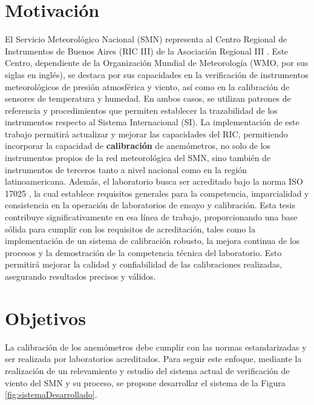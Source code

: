 \section{Motivación}\label{sec:motivacion}

El Servicio Meteorológico Nacional (SMN) representa al Centro Regional de Instrumentos de Buenos Aires (RIC III) de la Asociación Regional III \cite{RIC_Argentina}. Este Centro, dependiente de la Organización Mundial de Meteorología (WMO, por sus siglas en inglés), se destaca por sus capacidades en la verificación de instrumentos meteorológicos de presión atmosférica y viento, así como en la calibración de sensores de temperatura y humedad. En ambos casos, se utilizan patrones de referencia y procedimientos que permiten establecer la trazabilidad de los instrumentos respecto al Sistema Internacional (SI). La implementación de este trabajo permitirá actualizar y mejorar las capacidades del RIC, permitiendo incorporar la capacidad de \textbf{calibración} de anemómetros, no solo de los instrumentos propios de la red meteorológica del SMN, sino también de instrumentos de terceros tanto a nivel nacional como en la región latinoamericana.  Además, el laboratorio busca ser acreditado bajo la norma ISO 17025 \cite{ISO17025}, la cual establece requisitos generales para la competencia, imparcialidad y consistencia en la operación de laboratorios de ensayo y calibración. Esta tesis contribuye significativamente en esa línea de trabajo, proporcionando una base sólida para cumplir con los requisitos de acreditación, tales como la implementación de un sistema de calibración robusto, la mejora continua de los procesos y la demostración de la competencia técnica del laboratorio. Esto permitirá mejorar la calidad y confiabilidad de las calibraciones realizadas, asegurando resultados precisos y válidos.

\section{Objetivos}\label{sec:objetivos}

La calibración de los anemómetros debe cumplir con las normas estandarizadas  \cite{ISO16622} \cite{ISO17713-1} \cite{IEC61400-12-1} y ser realizada por laboratorios acreditados. Para seguir este enfoque, mediante la realización de un relevamiento y estudio del sistema actual de verificación de viento del SMN y su proceso, se propone desarrollar el sistema de la Figura \ref{fig:sistemaDesarrollado}.

